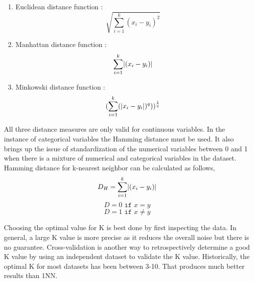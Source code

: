 \begin{enumerate}
    \item Euclidean distance function :
    \begin{equation}
        \sqrt{\sum_{i=1}^{k}(x_i-y_i)^2}
    \end{equation}
    \item Manhattan distance function :
    \begin{equation}
         \sum_{i=1}^{k}\lvert(x_i-y_i)\rvert
    \end{equation}
    \item Minkowski distance function :
    \begin{equation}
        ({\sum_{i=1}^{k}(\lvert x_i-y_i\rvert)^q)})^\frac{1}{q}
    \end{equation}
    
\end{enumerate}
\par\noindent
All three distance measures are only valid for continuous variables. In the instance of categorical variables the Hamming distance must be used. It also brings up the issue of standardization of the numerical variables between 0 and 1 when there is a mixture of numerical and categorical variables in the dataset. Hamming distance for k-nearest neighbor can be calculated as follows,
\begin{equation}
    D_H = \sum_{i=1}^{k}\lvert(x_i-y_i)\rvert
\end{equation}
$$ D = 0 \texttt{ if } x = y $$
$$ D = 1 \texttt{ if } x\neq y $$
\par\noindent
Choosing the optimal value for K is best done by first inspecting the data. In general, a large K value is more precise as it reduces the overall noise but there is no guarantee.  Cross-validation is another way to retrospectively determine a good K value by using an independent dataset to validate the K value. Historically, the optimal K for most datasets has been between 3-10. That produces much better results than 1NN.
\clearpage

